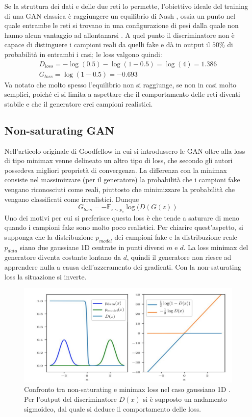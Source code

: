 \documentclass[a4paper]{article}
\begin{document}
Se la struttura dei dati e delle due reti lo permette, l'obiettivo ideale del training di una GAN classica è raggiungere un equilibrio di Nash
\cite{Nash48}, ossia un punto nel quale entrambe le reti si trovano in una configurazione di pesi dalla quale non hanno alcun vantaggio ad allontanarsi  \cite{manypathsgan}. A quel punto il discriminatore non è capace di distinguere i campioni reali da quelli fake e dà in output il $50\%$ di probabilità in entrambi i casi; le loss valgono quindi:
\begin{align}
D_{loss} = - \log(0.5) - \log(1 - 0.5) = \log(4) = 1.386\\
G_{loss} = \log(1- 0.5) = - 0.693 
\end{align}
Va notato che molto spesso l'equilibrio non si raggiunge, se non in casi molto semplici, poiché ci si limita a aspettare che il comportamento delle reti diventi stabile e che il generatore crei campioni realistici.
\subsection{Non-saturating GAN}
\label{Non-saturating GAN}
Nell'articolo originale di Goodfellow in cui si introdussero le GAN oltre alla loss di tipo minimax venne delineato un altro tipo di loss, che secondo gli autori possedeva migliori proprietà di convergenza.
La differenza con la minimax consiste nel massimizzare (per il generatore) la probabilità che i campioni fake vengano riconosciuti come reali, piuttosto che minimizzare la probabilità che vengano classificati come irrealistici. Dunque 
\begin{equation}
G_{loss} = - \mathbb{E}_{z \sim p_z} \log(D(G(z))
\end{equation}
Uno dei motivi per cui si preferisce questa loss è che tende a saturare di meno quando i campioni fake sono molto poco realistici. Per chiarire quest'aspetto, si supponga che la distribuzione $p_{model}$ dei campioni fake e la distribuzione reale $p_{data}$ siano due gaussiane 1D centrate in punti diversi $m$ e $d$. La loss minimax del generatore diventa costante lontano da $d$, quindi il generatore non riesce ad apprendere nulla a causa dell'azzeramento dei gradienti. Con la non-saturating loss la situazione si inverte. 
\begin{figure}[H]
\includegraphics[scale=0.5]{non-saturating-GAN.png}
\centering
\caption{Confronto tra non-saturating e minimax loss nel caso gaussiano 1D \cite{manypathsgan}. Per l'output del discriminatore $D(x)$ si è supposto un andamento sigmoideo, dal quale si deduce il comportamento delle loss.}
\end{figure}
\end{document}
